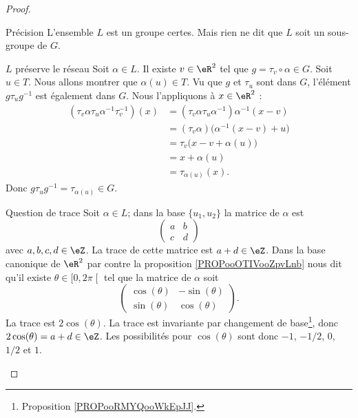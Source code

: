 \begin{proof}
\begin{subproof}
        \item[Précision]
            L'ensemble \( L\) est un groupe certes. Mais rien ne dit que \( L\) soit un sous-groupe de \( G\).
        \item[\( L\) préserve le réseau]
            Soit \( \alpha\in L\). Il existe \( v\in \eR^2\) tel que \( g=\tau_v\circ \alpha\in G\). Soit \( u\in T\). Nous allons montrer que \( \alpha(u)\in T\). Vu que \( g\) et \( \tau_u\) sont dans \( G\), l'élément \( g\tau_ug^{-1}\) est également dans \( G\). Nous l'appliquons à \( x\in \eR^2\) :
            \begin{subequations}
                \begin{align}
                    (\tau_v\alpha\tau_u\alpha^{-1}\tau_v^{-1})(x)&=(\tau_v\alpha\tau_u\alpha^{-1})\alpha^{-1}(x-v)\\
                    &=(\tau_v\alpha)\big( \alpha^{-1}(x-v)+u \big)\\
                    &=\tau_v\big( x-v+\alpha(u) \big)\\
                    &=x+\alpha(u)\\
                    &=\tau_{\alpha(u)}(x).
                \end{align}
            \end{subequations}
            Donc \( g\tau_ug^{-1}=\tau_{\alpha(u)}\in G\).
        \item[Question de trace]
            Soit \( \alpha\in L\); dans la base \( \{ u_1,u_2 \}\) la matrice de \( \alpha\) est
            \begin{equation}
                \begin{pmatrix}
                    a&b\\
                    c&d
                \end{pmatrix}
            \end{equation}
            avec \( a,b,c,d\in \eZ\). La trace de cette matrice est \( a+d\in \eZ\). Dans la base canonique de \( \eR^2\) par contre la proposition \ref{PROPooOTIVooZpvLnb} nous dit qu'il existe \( \theta\in \mathopen[ 0 , 2\pi \mathclose[\) tel que la matrice de \( \alpha\) soit
                \begin{equation}
                    \begin{pmatrix}
                        \cos(\theta)    &   -\sin(\theta)    \\ 
                        \sin(\theta)    &   \cos(\theta)    
                    \end{pmatrix}.
                \end{equation}
                La trace est \( 2\cos(\theta)\). La trace est invariante par changement de base\footnote{Proposition \ref{PROPooRMYQooWkEpJJ}.}, donc \( 2\cos(\theta)=a+d\in \eZ\). Les possibilités pour \( \cos(\theta)\) sont donc \( -1\), \( -1/2\), \( 0\), \( 1/2\) et \( 1\).


\end{subproof}
\end{proof}
